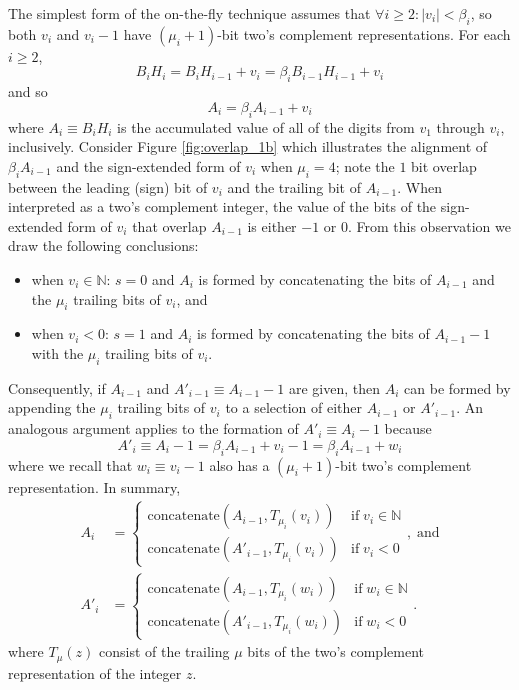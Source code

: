 \documentclass[10pt]{article}
\theoremstyle{definition}
\theoremstyle{remark}
\numberwithin{equation}{section}
\newcommand{\nats}{\mathbb{N}}
\newcommand{\abs}[1]{\lvert #1 \rvert}
\begin{document}
The simplest form of the on-the-fly technique assumes that 
$\forall i \ge 2: \abs{v_i} < \beta_i$, so both $v_i$ and $ v_i - 1$ have $(\mu_i+1)$-bit two's complement representations.
For each $i \ge 2$,
\[
B_i H_i = B_i H_{i-1} + v_i = \beta_i B_{i-1}H_{i-1} + v_i
\]
and so 
\[
A_i = \beta_i A_{i-1} + v_i
\]
where $A_i \equiv B_i H_i$ is the accumulated value of all of the digits from $v_1$ through $v_i$, inclusively.
Consider Figure \ref{fig:overlap_1b} which illustrates the alignment of $\beta_i A_{i-1}$ and the sign-extended form of $v_i$ when $\mu_i = 4$; note the $1$ bit overlap between the leading (sign) bit of $v_i$ and the trailing bit of $A_{i-1}$. 
When interpreted as a two's complement integer, the value of the bits of the sign-extended form of $v_i$ that overlap $A_{i-1}$ is either $-1$ or $0$. 
From this observation we draw the following conclusions:
\begin{itemize}[nosep]
	\item when $v_i \in \nats$: $s=0$ and $A_i$ is formed by concatenating the bits of $A_{i-1}$ and the $\mu_i$ trailing bits of $v_i$, and
	\item when $v_i < 0$: $s=1$ and $A_i$ is formed by concatenating the bits of $A_{i-1} - 1$ with the $\mu_i$ trailing bits of $v_i$.
\end{itemize}
Consequently, if $A_{i-1}$ and $A'_{i-1} \equiv A_{i-1}-1$ are given, then $A_i$ can be formed by appending the $\mu_i$ trailing bits of $v_i$ to a selection of either $A_{i-1}$ or $A'_{i-1}$. An analogous argument applies to the formation of $A'_i \equiv A_i - 1$ because
\[
A'_i \equiv A_i - 1 = \beta_i A_{i-1} + v_i - 1 = \beta_i A_{i-1} + w_i
\]
where we recall that $w_i \equiv v_i-1$ also has a $(\mu_i+1)$-bit two's complement representation. In summary,
\begin{align*}
A_i &= \begin{cases}
\mbox{concatenate}(A_{i-1},T_{\mu_i}(v_i)) & \text{if}\; v_i \in \nats \\
\mbox{concatenate}(A'_{i-1},T_{\mu_i}(v_i)) & \text{if}\; v_i < 0
\end{cases},  \;\text{and} \\
A'_i &= \begin{cases}
\mbox{concatenate}(A_{i-1},T_{\mu_i}(w_i)) & \text{if}\; w_i \in \nats \\
\mbox{concatenate}(A'_{i-1},T_{\mu_i}(w_i)) & \text{if}\; w_i < 0
\end{cases} .
\end{align*}
where $T_{\mu}(z)$ consist of the trailing $\mu$ bits of the two's complement representation of the integer $z$.
\end{document}
